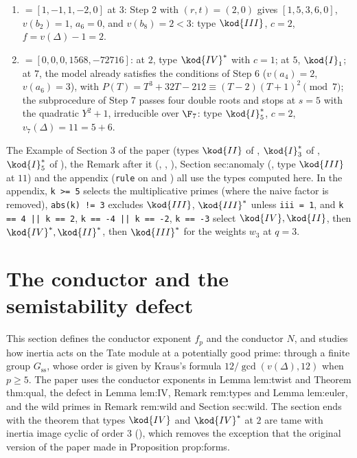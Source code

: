 \begin{example}
\begin{enumerate}[label=(\alph*)]
5 are passed ($v(a_6)=2$, $b_8=0$, $v(b_6)=4$). Step 6 with $(s,t)=(1,2)$: for a change $(1,0,s,t)$ of a model with
$a_1=a_3=0$ the formulas of  reduce to $a_1'=2s$, $a_2'=a_2-s^2$, $a_3'=2t$, $a_4'=a_4-2st$, $a_6'=a_6-t^2$, which
here give $[2,0,4,0,0]$, that is $y^2+2xy+4y=x^3$. Now $2\mid a_1,a_2$, $4\mid a_3,a_4$, $8\mid a_6$, and $P(T)=T^3$, a triple
root; Step 8: $Y^2+a_{3,2}Y-a_{6,4}=Y^2+Y$ has the distinct roots $0,1\in\F_2$. Type $\kod{IV}^*$, $c=3$, $f=8+1-7=2$.
\item {} $=[1,-1,1,-2,0]$ at $3$: Step 2 with $(r,t)=(2,0)$ gives $[1,5,3,6,0]$, $v(b_2)=1$, $a_6=0$, and
$v(b_8)=2<3$: type $\kod{III}$, $c=2$, $f=v(\Delta)-1=2$.
\item {} $=[0,0,0,1568,-72716]$: at $2$, type $\kod{IV}^*$ with $c=1$; at $5$, $\kod{I}_1$; at $7$, the model
already satisfies the conditions of Step 6 ($v(a_4)=2$, $v(a_6)=3$), with $P(T)=T^3+32T-212\equiv(T-2)(T+1)^2\pmod7$; the
subprocedure of Step 7 passes four double roots and stops at $s=5$ with the quadratic $Y^2+1$, irreducible over $\F_7$:
type $\kod{I}_5^*$, $c=2$, $v_7(\Delta)=11=5+6$.
\end{enumerate}
\end{example}

\begin{paperlink}
The Example of Section 3 of the paper (types $\kod{II}$ of , $\kod{I}_3^*$ of , $\kod{I}_5^*$ of
), the Remark after it (, , ), Section sec:anomaly (, type
$\kod{III}$ at $11$) and the appendix (\texttt{rule} on  and ) all use the types computed here. In the
appendix, \texttt{k >= 5} selects the multiplicative primes (where the naive factor is removed), \texttt{abs(k) != 3}
excludes $\kod{III}$, $\kod{III}^*$ unless \texttt{iii = 1}, and \texttt{k == 4 || k == 2}, \texttt{k == -4 || k == -2},
\texttt{k == -3} select $\kod{IV},\kod{II}$, then $\kod{IV}^*,\kod{II}^*$, then $\kod{III}^*$ for the weights $w_3$ at $q=3$.
\end{paperlink}

\section{The conductor and the semistability defect}\label{sec:reduction:conductor}

This section defines the conductor exponent $f_p$ and the conductor $N$, and studies how inertia acts on the Tate
module at a potentially good prime: through a finite group $G_{\mathrm{ss}}$, whose order is given by Kraus's formula
$12/\gcd(v(\Delta),12)$ when $p\ge5$. The paper uses the conductor exponents in Lemma lem:twist and Theorem thm:qual,
the defect in Lemma lem:IV, Remark rem:types and Lemma lem:euler, and the wild primes in Remark rem:wild and
Section sec:wild. The section ends with the theorem that types $\kod{IV}$ and $\kod{IV}^*$ at $2$ are tame with inertia
image cyclic of order $3$ (), which removes the exception that the original version of
the paper made in Proposition prop:forms.

